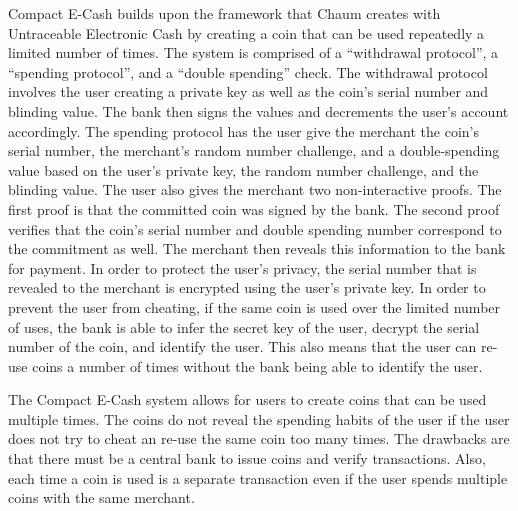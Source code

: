 Compact E-Cash builds upon the framework that Chaum creates with Untraceable Electronic Cash by creating a coin that can be used repeatedly a limited number of times.  The system is comprised of a “withdrawal protocol”, a “spending protocol”, and a “double spending” check.  The withdrawal protocol involves the user creating a private key as well as the coin’s serial number and blinding value.  The bank then signs the values and decrements the user’s account accordingly.  The spending protocol has the user give the merchant the coin’s serial number, the merchant’s random number challenge, and a double-spending value based on the user’s private key, the random number challenge, and the blinding value.  The user also gives the merchant two non-interactive proofs.  The first proof is that the committed coin was signed by the bank.  The second proof verifies that the coin’s serial number and double spending number correspond to the commitment as well.  The merchant then reveals this information to the bank for payment.  In order to protect the user’s privacy, the serial number that is revealed to the merchant is encrypted using the user’s private key.  In order to prevent the user from cheating, if the same coin is used over the limited number of uses, the bank is able to infer the secret key of the user, decrypt the serial number of the coin, and identify the user.  This also means that the user can re-use coins a number of times without the bank being able to identify the user.
 
The Compact E-Cash system allows for users to create coins that can be used multiple times.  The coins do not reveal the spending habits of the user if the user does not try to cheat an re-use the same coin too many times.  The drawbacks are that there must be a central bank to issue coins and verify transactions.  Also, each time a coin is used is a separate transaction even if the user spends multiple coins with the same merchant.

